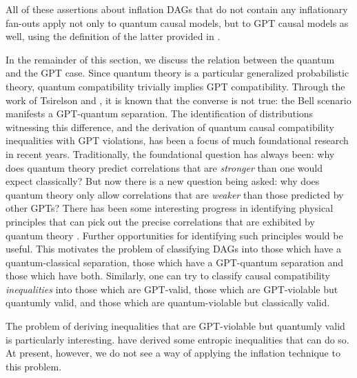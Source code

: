 \documentclass[aps,english,superscriptaddress,onecolumn,twoside,longbibliography,pra,floatfix,fleqn,nofootinbib]{revtex4-1}%
\theoremstyle{definition}
\begin{document}
All of these assertions about inflation DAGs that do not contain any inflationary fan-outs apply not only to quantum causal models, but to GPT causal models as well, using the definition of the latter provided in \cite{pusey2014gdag}.  


In the remainder of this section, we discuss the relation between the quantum and the GPT case. Since quantum theory is a particular generalized probabilistic theory, quantum compatibility trivially implies GPT compatibility. Through the work of Tsirelson \cite{Tsirelson1980} and \citet{PROriginal}, it is known that the converse is not true: the Bell scenario manifests a GPT-quantum separation.  The identification of distributions witnessing this difference, and the derivation of quantum causal compatibility inequalities with GPT violations, has been a focus of much foundational research in recent years. Traditionally, the foundational question has always been: why does quantum theory predict correlations that are {\em stronger} than one would expect classically?  But now there is a new question being asked: why does quantum theory only allow correlations that are {\em weaker} than those predicted by other GPTs?  There has been some interesting progress in identifying physical principles that can pick out the precise correlations that are exhibited by quantum theory \cite{PopescuReviewNatureComm,ScaraniML,Rohrlich2014,InfoCausArXiv,LONatureComm,LOExploring,EPNBody,barnum2014interference,AlmostQuantum}.  Further opportunities for identifying such principles would be useful.  This motivates the problem of classifying DAGs into those which have a quantum-classical separation, those which have a GPT-quantum separation and those which have both. Similarly, one can try to classify causal compatibility \emph{inequalities} into those which are GPT-valid, those which are GPT-violable but quantumly valid, and those which are quantum-violable but classically valid. 

The problem of deriving inequalities that are GPT-violable but quantumly valid is particularly interesting.  
\citet{Chaves2015infoquantum} have derived some entropic inequalities that can do so.  At present, however, we do not see a way of applying the inflation technique to this problem. 
\end{document}
